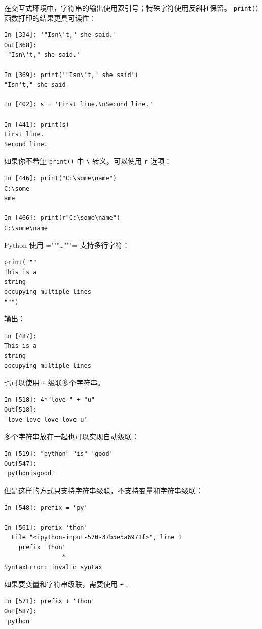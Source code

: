 \documentclass[10pt,a4paper,UTF8]{article}
\begin{document}
在交互式环境中，字符串的输出使用双引号；特殊字符使用反斜杠保留。 \texttt{print()} 函数打印的结果更具可读性：
\lstset{language=Python,label= ,caption= ,captionpos=b,numbers=none}
\begin{lstlisting}
In [334]: '"Isn\'t," she said.'
Out[368]: 
'"Isn\'t," she said.'

In [369]: print('"Isn\'t," she said')
"Isn't," she said

In [402]: s = 'First line.\nSecond line.'

In [441]: print(s)
First line.
Second line.
\end{lstlisting}
如果你不希望 \texttt{print()} 中 \texttt{\textbackslash{}} 转义，可以使用 \texttt{r} 选项：
\lstset{language=Python,label= ,caption= ,captionpos=b,numbers=none}
\begin{lstlisting}
In [446]: print("C:\some\name")
C:\some
ame

In [466]: print(r"C:\some\name")
C:\some\name
\end{lstlisting}
Python 使用 ="""\ldots{}"""= 支持多行字符：
\lstset{language=Python,label= ,caption= ,captionpos=b,numbers=none}
\begin{lstlisting}
print("""
This is a
string
occupying multiple lines
""")
\end{lstlisting}
输出：
\begin{verbatim}
In [487]: 
This is a
string
occupying multiple lines
\end{verbatim}
也可以使用 \texttt{+} 级联多个字符串。
\lstset{language=Python,label= ,caption= ,captionpos=b,numbers=none}
\begin{lstlisting}
In [518]: 4*"love " + "u"
Out[518]: 
'love love love love u'
\end{lstlisting}

多个字符串放在一起也可以实现自动级联：
\lstset{language=Python,label= ,caption= ,captionpos=b,numbers=none}
\begin{lstlisting}
In [519]: "python" "is" 'good'
Out[547]: 
'pythonisgood'
\end{lstlisting}

但是这样的方式只支持字符串级联，不支持变量和字符串级联：
\lstset{language=Python,label= ,caption= ,captionpos=b,numbers=none}
\begin{lstlisting}
In [548]: prefix = 'py'

In [561]: prefix 'thon'
  File "<ipython-input-570-37b5e5a6971f>", line 1
    prefix 'thon'
                ^
SyntaxError: invalid syntax
\end{lstlisting}
如果要变量和字符串级联，需要使用 \texttt{+} :
\lstset{language=Python,label= ,caption= ,captionpos=b,numbers=none}
\begin{lstlisting}
In [571]: prefix + 'thon'
Out[587]: 
'python'
\end{lstlisting}
\end{document}
